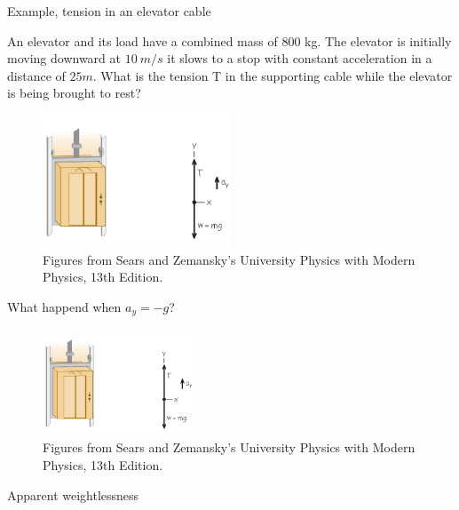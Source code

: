 \documentclass[]{beamer}
\begin{document}


    \begin{frame}
Example, tension in an elevator cable
\vspace{3mm}


An elevator and its load have a combined mass of 800 kg.
The elevator is initially moving downward at $10~m/s$ it slows to
a stop with constant acceleration in a distance of $25 m$. What is
the tension T in the supporting cable while the elevator is being
brought to rest?

\begin{figure}[h!]  
  \includegraphics[width=0.5\textwidth]{images/f17.jpg}
  \caption{ {\tiny Figures from Sears and Zemansky's University Physics 
  with Modern Physics, 13th Edition.} }
\end{figure}



      \end{frame}




    \begin{frame}
      
What happend when $a_y=-g$?
\vspace{3mm}



\begin{figure}[h!]  
  \includegraphics[width=0.4\textwidth]{images/f17.jpg}
  \caption{ {\tiny Figures from Sears and Zemansky's University Physics 
  with Modern Physics, 13th Edition.} }
\end{figure}

\pause
Apparent weightlessness


      \end{frame}
\end{document}
